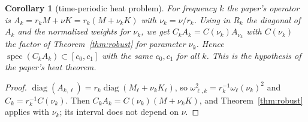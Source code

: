 \documentclass[11pt,a4paper]{article}
\newtheorem{corollary}[theorem]{Corollary}
\theoremstyle{remark}
\begin{document}
\begin{corollary}[time-periodic heat problem]\label{cor:heat}
For frequency $k$ the paper's operator is $A_k=r_kM+\nu K=r_k(M+\nu_kK)$ with
$\nu_k=\nu/r_k$. Using in $R_k$ the diagonal of $A_k$ and the normalized weights
for $\nu_k$, we get $C_kA_k=C(\nu_k)A_{\nu_k}$ with $C(\nu_k)$ the factor of
Theorem~\ref{thm:robust} for parameter $\nu_k$. Hence
$\operatorname{spec}(C_kA_k)\subset[c_0,c_1]$ with the \emph{same} $c_0,c_1$ for all $k$. This is the
hypothesis of the paper's heat theorem.
\end{corollary}
\begin{proof}
$\operatorname{diag}(A_{k,\ell})=r_k\operatorname{diag}(M_\ell+\nu_kK_\ell)$, so $\omega_{\ell,k}^2=r_k^{-1}\omega_\ell(\nu_k)^2$ and
$C_k=r_k^{-1}C(\nu_k)$. Then $C_kA_k=C(\nu_k)(M+\nu_kK)$, and Theorem~\ref{thm:robust}
applies with $\nu_k$; its interval does not depend on $\nu$.
\end{proof}
\end{document}
